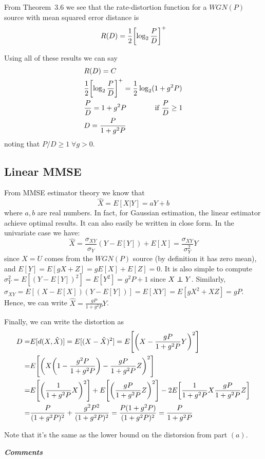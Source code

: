 From Theorem~3.6 we see that the rate-distortion function for a $WGN(P)$ source with mean squared error distance is
%
\begin{equation}
R(D) = \frac{1}{2} \qty[\log_2 \frac{P}{D}]^+
\end{equation}

Using all of these results we can say
%
\begin{align}
\begin{split}
&R(D)=C\\
&\frac{1}{2} \qty[\log_2 \frac{P}{D}]^+ = \frac{1}{2} \log_2(1+g^2P) \\
&\frac{P}{D} = 1+g^2P \qquad\qquad \mbox{if } \frac{P}{D} \geq 1\\
&D= \frac{P}{1+g^2P}
\end{split}
\end{align}
%
noting that $P/D \geq 1 \; \forall g>0$.

\subsection{Linear MMSE}
From MMSE estimator theory we know that
%
\begin{equation}
\hat{X} = E[X|Y] = aY+b
\end{equation}
%
where $a,b$ are real numbers. In fact, for Gaussian estimation, the linear estimator achieve optimal results. It can also easily be written in close form. In the univariate case we have:
%
\begin{equation}
\hat{X} = \frac{\sigma_{XY}}{\sigma_Y} (Y-E[Y]) + E[X] = \frac{\sigma_{XY}}{\sigma_Y^2} Y
\end{equation}
%
since $X=U$ comes from the $WGN(P)$ source (by definition it has zero mean), and $E[Y]=E[gX+Z] = gE[X]+E[Z] = 0$. It is also simple to compute $\sigma_Y^2 = E[(Y-E[Y])^2] = E[Y^2] = g^2P+1$ since $X\independent Y$. Similarly, $\sigma_{XY} = E[(X-E[X])(Y-E[Y])] = E[XY] = E[gX^2+XZ] = gP$.\\
Hence, we can write $\hat{X} = \frac{gP}{1+g^2P}Y$.

Finally, we can write the distortion as
%
\begin{align}
\begin{split}
D =& E[d(X,\hat{X})] = E[(X-\hat{X})^2] = E \qty[\qty(X-\frac{gP}{1+g^2P}Y)^2]\\
=& E \qty[\qty( X \qty(1-\frac{g^2P}{1+g^2P}) - \frac{gP}{1+g^2P}Z)^2]\\
=& E \qty[\qty( \frac{1}{1+g^2P}X)^2] + E\qty[\qty( \frac{gP}{1+g^2P}Z)^2] - 2E\qty[ \frac{1}{1+g^2P}X \frac{gP}{1+g^2P}Z ]\\
=& \frac{P}{(1+g^2P)^2} + \frac{g^2P^2}{(1+g^2P)^2} = \frac{P(1+g^2P)}{(1+g^2P)^2} = \frac{P}{1+g^2P}
\end{split}
\end{align}

Note that it's the same as the lower bound on the distorsion from part $(a)$.

\textbf{\textit{\Huge Comments}}

